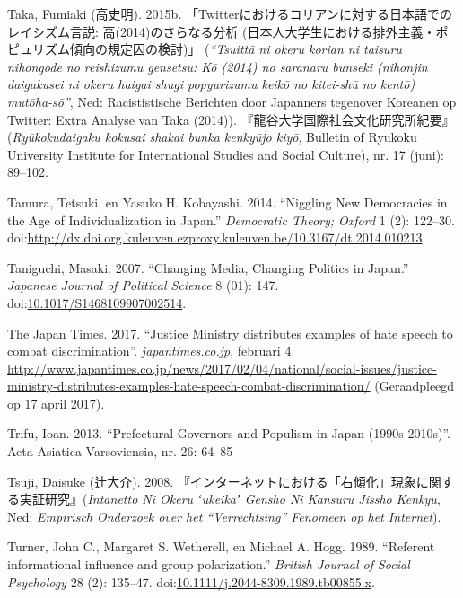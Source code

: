 \documentclass[10.5pt,dutch,]{article}
\begin{document}
\hypertarget{ref-takaux5ftwitterux5f2015}{}
Taka, Fumiaki (高史明). 2015b. 「Twitterにおけるコリアンに対する日本語でのレイシズム言説: 高(2014)のさらなる分析 (日本人大学生における排外主義・ポピュリズム傾向の規定囚の検討)」 (\emph{“Tsuittā ni okeru korian ni taisuru nihongode no reishizumu gensetsu: Kō (2014) no saranaru bunseki (nihonjin daigakusei ni okeru haigai shugi popyurizumu keikō no kitei-shū no kentō) mutōha-sō”}, Ned: Racististische Berichten door Japanners tegenover Koreanen op Twitter: Extra Analyse van Taka (2014)).  『龍谷大学国際社会文化研究所紀要』(\emph{Ryūkokudaigaku kokusai shakai bunka kenkyūjo kiyō}, Bulletin of Ryukoku University Institute for International Studies and Social Culture), nr. 17 (juni): 89--102.

\hypertarget{ref-tamuraux5fnigglingux5f2014}{}
Tamura, Tetsuki, en Yasuko H. Kobayashi. 2014. “Niggling New Democracies
in the Age of Individualization in Japan.” \emph{Democratic Theory;
Oxford} 1 (2): 122--30.
doi:\href{https://doi.org/http://dx.doi.org.kuleuven.ezproxy.kuleuven.be/10.3167/dt.2014.010213}{http://dx.doi.org.kuleuven.ezproxy.kuleuven.be/10.3167/dt.2014.010213}.

\hypertarget{ref-taniguchiux5fchangingux5f2007}{}
Taniguchi, Masaki. 2007. “Changing Media, Changing Politics in Japan.”
\emph{Japanese Journal of Political Science} 8 (01): 147.
doi:\href{https://doi.org/10.1017/S1468109907002514}{10.1017/S1468109907002514}.

\hypertarget{ref-theux5fjapanux5ftimesux5fjusticeux5f2017}{}
The Japan Times. 2017. “Justice Ministry distributes examples of hate speech to combat discrimination”. \emph{japantimes.co.jp}, februari 4. \url{http://www.japantimes.co.jp/news/2017/02/04/national/social-issues/justice-ministry-distributes-examples-hate-speech-combat-discrimination/} (Geraadpleegd op 17 april 2017).

\hypertarget{ref-trifuux5fprefecturalux5f2013}{}
Trifu, Ioan. 2013. “Prefectural Governors and Populism in Japan (1990s-2010s)”. Acta Asiatica Varsoviensia, nr. 26: 64–85

\hypertarget{ref-tsujiux5fintanettoux5f2008}{}
Tsuji, Daisuke (辻大介). 2008. 『インターネットにおける「右傾化」現象に関する実証研究』(\emph{Intanetto Ni Okeru ʻukeikaʼ Gensho Ni Kansuru Jissho Kenkyu}, Ned: \emph{Empirisch Onderzoek over het “Verrechtsing” Fenomeen op het Internet}).

\hypertarget{ref-turnerux5freferentux5f1989}{}
Turner, John C., Margaret S. Wetherell, en Michael A. Hogg. 1989.
“Referent informational influence and group polarization.” \emph{British
Journal of Social Psychology} 28 (2): 135--47.
doi:\href{https://doi.org/10.1111/j.2044-8309.1989.tb00855.x}{10.1111/j.2044-8309.1989.tb00855.x}.
\end{document}
